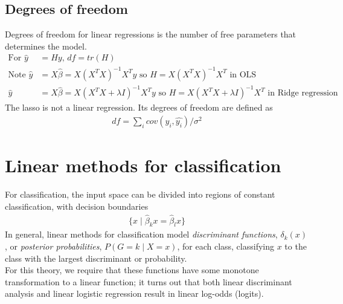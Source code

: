 \documentclass{article}
\begin{document}
\subsection{Degrees of freedom}
Degrees of freedom for linear regressions is the number of free parameters that determines the model. 
\begin{align*}
  \textrm{For } \hat{y} &= Hy \textrm{, } df = tr(H)\\
  \textrm{Note } \hat{y} &= X\hat{\beta} = X(X^TX)^{-1}X^Ty \textrm{ so } H = X(X^TX)^{-1}X^T \textrm{ in OLS}\\
  \hat{y} &= X\hat{\beta} = X(X^TX + \lambda I)^{-1}X^Ty \textrm{ so } H = X(X^TX + \lambda I)^{-1}X^T \textrm{ in Ridge regression}
\end{align*}
The lasso is not a linear regression. Its degrees of freedom are defined as
\begin{align*}
  df = \sum_i cov(y_i, \hat{y_i}) / \sigma^2
\end{align*}


\section{Linear methods for classification}
For classification, the input space can be divided into regions of constant classification, with decision boundaries
\begin{align*}
  \{ x \mid \hat{\beta}_kx = \hat{\beta}_lx \}
\end{align*}
In general, linear methods for classification model \textit{discriminant functions}, $\delta_k(x)$, or \textit{posterior probabilities}, $P(G=k \mid X=x)$, for each class, classifying $x$ to the class with the largest discriminant or probability.\\
For this theory, we require that these functions have some monotone transformation to a linear function; it turns out that both linear discriminant analysis and linear logistic regression result in linear log-odds (logits).
\end{document}
